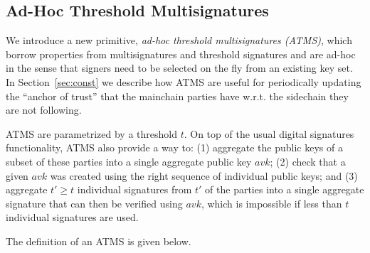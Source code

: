\subsection{Ad-Hoc Threshold Multisignatures}
\label{sec:ats}

We  introduce a new  primitive, \textit{ad-hoc threshold
multisignatures (ATMS)}, which borrow  properties from multisignatures and
threshold signatures and are ad-hoc in the sense that signers need to
be selected on the fly from an existing key set.
In Section~\ref{sec:const} we describe how ATMS
are useful for periodically updating the ``anchor of trust'' that the  mainchain parties
 have w.r.t. the sidechain they are not
following.

ATMS %
are parametrized by a threshold $t$.
On top of the usual digital signatures functionality, ATMS also provide a way to:
  (1)
  aggregate the public keys of a subset of these parties into a single aggregate public
  key $avk$;
    (2)
  check that a given $avk$ was created using the right sequence of individual public keys;
  and (3)
  aggregate $t'\geq t$ individual signatures from $t'$ of the parties into a single
    aggregate signature that can then be verified using $avk$, which is
    impossible if less than $t$ individual signatures are used.

The definition of an ATMS is given below.

